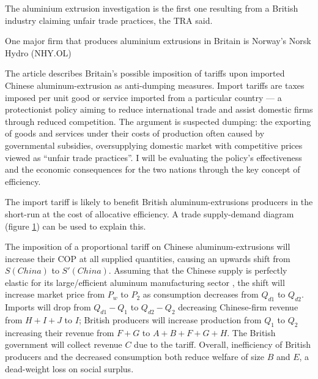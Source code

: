 \documentclass[a4paper,12pt]{article}
\newcommand{\tikzfig}[1]{}
\begin{document}
The aluminium extrusion investigation is the first one resulting from a British industry claiming unfair trade practices, the TRA said.

One major firm that produces aluminium extrusions in Britain is Norway's Norsk Hydro (NHY.OL)

\newpage

The article describes Britain's possible imposition of tariffs upon imported Chinese aluminum-extrusion as anti-dumping measures. Import tariffs are taxes imposed per unit good or service imported from a particular country --- a protectionist policy aiming to reduce international trade and assist domestic firms through reduced competition. The argument is suspected dumping: the exporting of goods and services under their costs of production often caused by governmental subsidies, oversupplying domestic market with competitive prices viewed as ``unfair trade practices''. I will be evaluating the policy's effectiveness and the economic consequences for the two nations through the key concept of efficiency.

The import tariff is likely to benefit British aluminum-extrusions producers in the short-run at the cost of allocative efficiency. A trade supply-demand diagram (figure \ref{fig:tariff}) can be used to explain this.

\begin{figure}[H]
	\centering
	 \tikzfig{assets/tariffs.txt}
	\caption{}
	\label{fig:tariff}
\end{figure}

The imposition of a proportional tariff on Chinese aluminum-extrusions will increase their COP at all supplied quantities, causing an upwards shift from $S(China)$ to $S'(China)$. Assuming that the Chinese supply is perfectly elastic for its large/efficient aluminum manufacturing sector \parencite{ilzetzki_2022}, the shift will increase market price from $P_w$ to $P_2$ as consumption decreases from $Q_{d1}$ to $Q_{d2}$.
Imports will drop from $Q_{d1}-Q_{1}$ to $Q_{d2}-Q_{2}$ decreasing Chinese-firm revenue from $H+I+J$ to $I$; British producers will increase production from $Q_1$ to $Q_2$ increasing their revenue from $F+G$ to $A+B+F+G+H$. The British government will collect revenue $C$ due to the tariff. Overall, inefficiency of British producers and the decreased consumption both reduce welfare of size $B$ and $E$, a dead-weight loss on social surplus.
\end{document}
